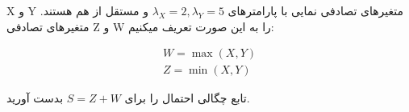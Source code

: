 X و Y
متغیرهای تصادفی نمایی با پارامترهای
${\lambda _X} = 2,{\lambda _Y} = 5$
و مستقل از هم هستند. متغیرهای تصادفی Z و W را به این صورت تعریف میکنیم:

$$
\begin{array}{l}
	W = \max (X,Y)\\
	Z = \min (X,Y)
\end{array}
$$

تابع چگالی احتمال را برای
$S = Z + W$
بدست آورید.